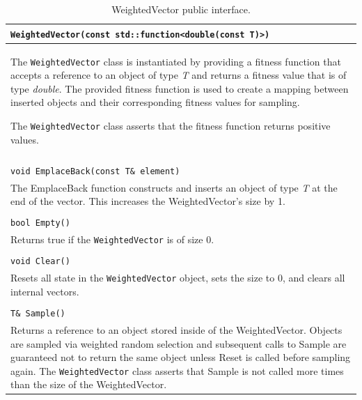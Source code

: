 \documentclass[12pt]{article}
\begin{document}
  \begin{table}[htbp]
    \caption{WeightedVector public interface.}
    \label{tab:wvpub}
    \begin{tabular}{ | p{1.0\linewidth} | }
      \hline
      \verb|WeightedVector(const std::function<double(const T)>)| \\ \hline
      The \texttt{WeightedVector} class is instantiated by providing a fitness function
      that accepts a reference to an object of type \emph{T} and returns a
      fitness value that is of type \emph{double}. The provided fitness function
      is used to create a mapping between inserted objects and their
      corresponding fitness values for sampling.

      The \texttt{WeightedVector} class asserts that the fitness function returns positive
      values. \\ \hline

      \\ \hline

      \verb|void EmplaceBack(const T& element)| \\ \hline
      The EmplaceBack function constructs and inserts an object of type
      \emph{T} at the end of the vector. This increases the WeightedVector's
      size by 1. \\ \hline

      \\ \hline

      \verb|bool Empty()| \\ \hline
      Returns true if the \texttt{WeightedVector} is of size 0. \\  \hline

      \\ \hline

      \verb|void Clear()| \\ \hline
      Resets all state in the \texttt{WeightedVector} object, sets the size to 0, and
      clears all internal vectors. \\ \hline

      \\ \hline

      \verb|T& Sample()|\\ \hline

      Returns a reference to an object stored inside of the WeightedVector.
      Objects are sampled via weighted random selection and subsequent calls to
      Sample are guaranteed not to return the same object unless Reset is called
      before sampling again. The \texttt{WeightedVector} class asserts that Sample is not
      called more times than the size of the WeightedVector.\\ \hline


\end{tabular}
\end{table}
\end{document}
